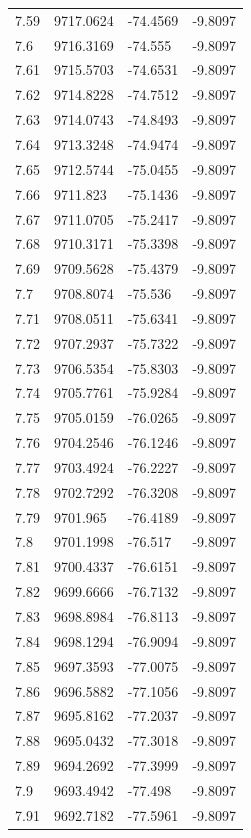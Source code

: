 \begin{table}[H]
\begin{tabular}{llll}
7.59 & 9717.0624 & -74.4569 & -9.8097 \\
7.6 & 9716.3169 & -74.555 & -9.8097 \\
7.61 & 9715.5703 & -74.6531 & -9.8097 \\
7.62 & 9714.8228 & -74.7512 & -9.8097 \\
7.63 & 9714.0743 & -74.8493 & -9.8097 \\
7.64 & 9713.3248 & -74.9474 & -9.8097 \\
7.65 & 9712.5744 & -75.0455 & -9.8097 \\
7.66 & 9711.823 & -75.1436 & -9.8097 \\
7.67 & 9711.0705 & -75.2417 & -9.8097 \\
7.68 & 9710.3171 & -75.3398 & -9.8097 \\
7.69 & 9709.5628 & -75.4379 & -9.8097 \\
7.7 & 9708.8074 & -75.536 & -9.8097 \\
7.71 & 9708.0511 & -75.6341 & -9.8097 \\
7.72 & 9707.2937 & -75.7322 & -9.8097 \\
7.73 & 9706.5354 & -75.8303 & -9.8097 \\
7.74 & 9705.7761 & -75.9284 & -9.8097 \\
7.75 & 9705.0159 & -76.0265 & -9.8097 \\
7.76 & 9704.2546 & -76.1246 & -9.8097 \\
7.77 & 9703.4924 & -76.2227 & -9.8097 \\
7.78 & 9702.7292 & -76.3208 & -9.8097 \\
7.79 & 9701.965 & -76.4189 & -9.8097 \\
7.8 & 9701.1998 & -76.517 & -9.8097 \\
7.81 & 9700.4337 & -76.6151 & -9.8097 \\
7.82 & 9699.6666 & -76.7132 & -9.8097 \\
7.83 & 9698.8984 & -76.8113 & -9.8097 \\
7.84 & 9698.1294 & -76.9094 & -9.8097 \\
7.85 & 9697.3593 & -77.0075 & -9.8097 \\
7.86 & 9696.5882 & -77.1056 & -9.8097 \\
7.87 & 9695.8162 & -77.2037 & -9.8097 \\
7.88 & 9695.0432 & -77.3018 & -9.8097 \\
7.89 & 9694.2692 & -77.3999 & -9.8097 \\
7.9 & 9693.4942 & -77.498 & -9.8097 \\
7.91 & 9692.7182 & -77.5961 & -9.8097 \\

\end{tabular}
\end{table}
